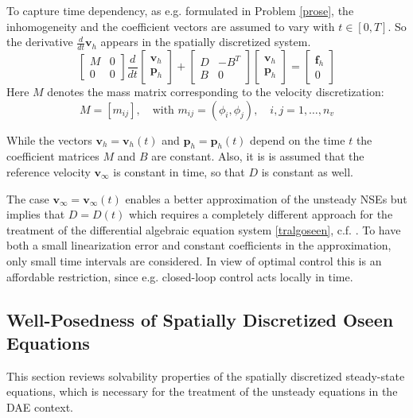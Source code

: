 \documentclass[a4paper,10pt,BCOR=15mm]{scrbook}
\begin{document}
To capture time dependency, as e.g. formulated in Problem \ref{prose}, the inhomogeneity and the coefficient vectors are assumed to vary with $t \in [0,T]$. So the derivative $\frac{d}{dt}\mathbf v_h$ appears in the spatially discretized system.
\begin{equation}\label{tralgoseen}
	 \begin{bmatrix} M& 0 \\ 0& 0 \end{bmatrix} \frac{d}{dt}\begin{bmatrix} {\mathbf v}_h \\ {\mathbf p}_h  \end{bmatrix}+ \begin{bmatrix} D& -B^T \\ B& 0 \end{bmatrix} \begin{bmatrix} {\mathbf v}_h \\ {\mathbf p}_h  \end{bmatrix} = \begin{bmatrix} {\mathbf f}_h \\ 0 \end{bmatrix} 
\end{equation}
Here $M$ denotes the mass matrix corresponding to the velocity discretization:
\begin{equation*}
 M = [m_{ij}], \quad \text{with  } m_{ij} = (\phi_i,\phi_j), \quad i,j=1,\dots,n_v
\end{equation*}

\begin{rem}
 While the vectors $\mathbf v_h = \mathbf v_h(t)$ and $\mathbf p_h = \mathbf p_h(t)$ depend on the time $t$ the coefficient matrices $M$ and $B$ are constant. Also, it is is assumed that the reference velocity $\mathbf v_\infty$ is constant in time, so that $D$ is constant as well. 

The case $ \mathbf v_\infty =\mathbf v_\infty(t)$ enables a better approximation of the unsteady NSEs but implies that $D=D(t)$ which requires a completely different approach for the treatment of the differential algebraic equation system \eqref{tralgoseen}, c.f. \cite{mehr}. To have both a small linearization error and constant coefficients in the approximation, only small time intervals are considered. In view of optimal control this is an affordable restriction, since e.g. closed-loop control acts locally in time.
\end{rem}


\subsection{Well-Posedness of Spatially Discretized Oseen Equations}\label{wpsoe}
This section reviews solvability properties of the spatially discretized steady-state equations, which is necessary for the treatment of the unsteady equations in the DAE context.
\end{document}
